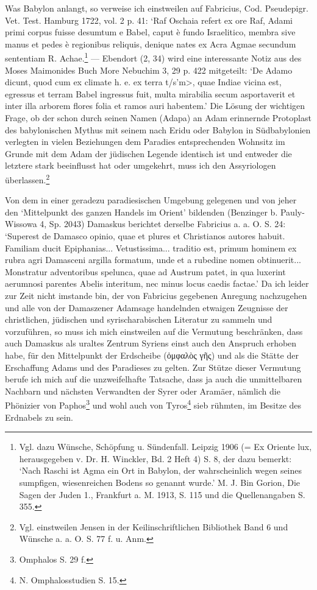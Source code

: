 \documentclass[a4paper, 11pt, oneside]{article}
\begin{document}
Was Babylon anlangt, so verweise ich einstweilen auf Fabricius, Cod. Pseudepigr. Vet. Test. Hamburg 1722, vol. 2 p. 41: `Raf Oschaia refert ex ore Raf, Adami primi corpus fuisse desumtum e Babel, caput è fundo Israelitico, membra sive manus et pedes è regionibus reliquis, denique nates ex Acra Agmae secundum sententiam R. Achae.\footnote{Vgl. dazu Wünsche, Schöpfung u. Sündenfall. Leipzig 1906 (= Ex Oriente lux, herausgegeben v. Dr. H. Winckler, Bd. 2 Heft 4) S. 8, der dazu bemerkt: `Nach Raschi ist Agma ein Ort in Babylon, der wahrscheinlich wegen seines sumpfigen, wiesenreichen Bodens so genannt wurde.' M. J. Bin Gorion, Die Sagen der Juden 1., Frankfurt a. M. 1913, S. 115 und die Quellenangaben S. 355.} --- Ebendort (2, 34) wird eine interessante Notiz aus des Moses Maimonides Buch More Nebuchim 3, 29 p. 422 mitgeteilt: `De Adamo dicunt, quod cum ex climate h. e. ex terra \<t/s'm>, quae Indiae vicina est, egressus et terram Babel ingressus fuit, multa mirabilia secum asportaverit et inter illa arborem flores folia et ramos auri habentem.' Die Lösung der wichtigen Frage, ob der schon durch seinen Namen (Adapa) an Adam erinnernde Protoplast des babylonischen Mythus mit seinem nach Eridu oder Babylon in Südbabylonien verlegten in vielen Beziehungen dem Paradies entsprechenden Wohnsitz im Grunde mit dem Adam der jüdischen Legende identisch ist und entweder die letztere stark beeinflusst hat oder umgekehrt, muss ich den Assyriologen überlassen.\footnote{Vgl. einstweilen Jensen in der Keilinschriftlichen Bibliothek Band 6 und Wünsche a. a. O. S. 77 f. u. Anm.}

Von dem in einer geradezu paradiesischen Umgebung gelegenen und von jeher den `Mittelpunkt des ganzen Handels im Orient' bildenden (Benzinger b. Pauly-Wissowa 4, Sp. 2043) Damaskus berichtet derselbe Fabricius a. a. O. S. 24: `Superest de Damasco opinio, quae et plures et Christianos autores habuit. Familiam ducit Epiphanias... Vetustissima... traditio est, primum hominem ex rubra agri Damasceni argilla formatum, unde et a rubedine nomen obtinuerit... Monstratur adventoribus spelunca, quae ad Austrum patet, in qua luxerint aerumnosi parentes Abelis interitum, nec minus locus caedis factae.' Da ich leider zur Zeit nicht imstande bin, der von Fabricius gegebenen Anregung nachzugehen und alle von der Damaszener Adamsage handelnden etwaigen Zeugnisse der christlichen, jüdischen und syrischarabischen Literatur zu sammeln und vorzuführen, so muss ich mich einstweilen auf die Vermutung beschränken, dass auch Damaskus als uraltes Zentrum Syriens einst auch den Anspruch erhoben habe, für den Mittelpunkt der Erdscheibe (ὀμφαλὸς γῆς) und als die Stätte der Erschaffung Adams und des Paradieses zu gelten. Zur Stütze dieser Vermutung berufe ich mich auf die unzweifelhafte Tatsache, dass ja auch die unmittelbaren Nachbarn und nächsten Verwandten der Syrer oder Aramäer, nämlich die Phönizier von Paphos\footnote{Omphalos S. 29 f.} und wohl auch von Tyros\footnote{N. Omphalosstudien S. 15.} sieb rühmten, im Besitze des Erdnabels zu sein.
\end{document}
